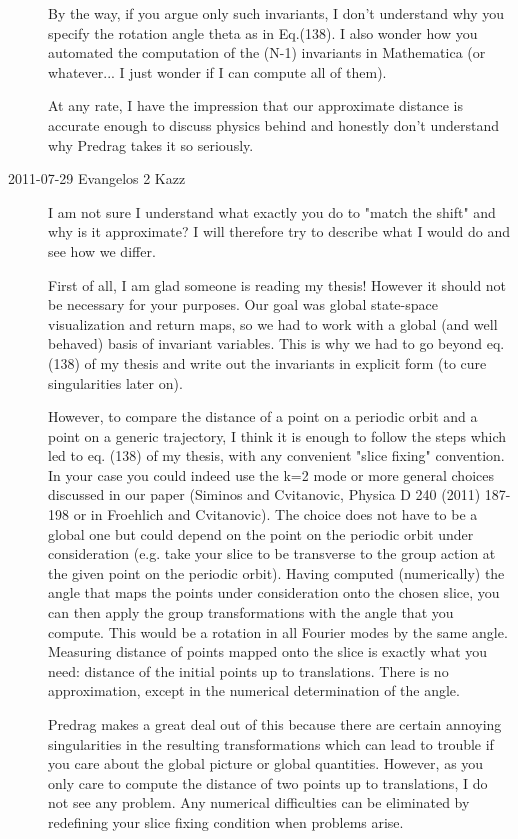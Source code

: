 \begin{description}
By the way, if you argue only such invariants, I don't understand why you specify the rotation angle theta as in Eq.(138). I also wonder how you automated the computation of the (N-1) invariants in Mathematica (or whatever... I just wonder if I can compute all of them).

At any rate, I have the impression that our approximate distance is accurate enough to discuss physics behind and honestly don't understand why Predrag takes it so seriously.

\item[2011-07-29 Evangelos 2 Kazz]
I am not sure I understand what exactly you do to "match the shift"
and why is it approximate? I will therefore try to describe what I
would do and see how we differ.

First of all, I am glad someone is reading my thesis! However it
should not be necessary for your purposes. Our goal was global
state-space visualization and return maps, so we had to work with a
global (and well behaved) basis of invariant variables. This is why we
had to go beyond eq. (138) of my thesis and write out the invariants
in explicit form (to cure singularities later on).

However, to compare the distance of a point on a periodic orbit and a
point on a generic trajectory, I think it is enough to follow the
steps which led to eq. (138) of my thesis, with any convenient "slice
fixing" convention. In your case you could indeed use the k=2 mode or
more general choices discussed in our paper (Siminos and Cvitanovic,
Physica D 240 (2011) 187-198 or in Froehlich and Cvitanovic). The
choice does not have to be a global one but could depend on the point
on the periodic orbit under consideration (e.g. take your slice to be
transverse to the group action at the given point on the periodic
orbit). Having computed (numerically) the angle that maps the points
under consideration onto the chosen slice, you can then apply the
group transformations with the angle that you compute. This would be a
rotation in all Fourier modes by the same angle. Measuring distance of
points mapped onto the slice is exactly what you need: distance of the
initial points up to translations. There is no approximation, except
in the numerical determination of the angle. 

Predrag makes a great deal out of this because there are certain
annoying singularities in the resulting transformations which can lead
to trouble if you care about the global picture or global quantities.
However, as you only care to compute the distance of two points up to
translations, I do not see any problem. Any numerical difficulties can
be eliminated by redefining your slice fixing condition when problems
arise.


\end{description}
